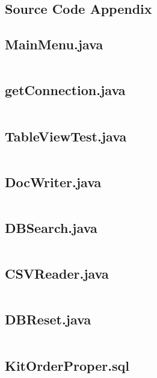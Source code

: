 \documentclass[
11pt, %
a4paper, %
oneside, %
headinclude,footinclude, %
BCOR5mm, %
]{scrartcl}
\begin{document}
\begin{appendices}
\section{Source Code Appendix}
\subsection{MainMenu.java}
\inputminted[linenos, breaklines]{java}{/Users/tsmoffat/kitordersystem/kitordersystem/kitordersystem/MainMenu.java}
\subsection{getConnection.java}
\inputminted[linenos, breaklines]{java}{/Users/tsmoffat/kitordersystem/kitordersystem/kitordersystem/getConnection.java}
\subsection{TableViewTest.java}
\inputminted[linenos, breaklines]{java}{/Users/tsmoffat/kitordersystem/kitordersystem/kitordersystem/TableViewTest.java}
\subsection{DocWriter.java}
\inputminted[linenos, breaklines]{java}{/Users/tsmoffat/kitordersystem/kitordersystem/kitordersystem/DocWriter.java}
\subsection{DBSearch.java}
\inputminted[linenos, breaklines]{java}{/Users/tsmoffat/kitordersystem/kitordersystem/kitordersystem/DBSearch.java}
\subsection{CSVReader.java}
\inputminted[linenos, breaklines]{java}{/Users/tsmoffat/kitordersystem/kitordersystem/kitordersystem/CSVReader.java}
\subsection{DBReset.java}
\inputminted[linenos, breaklines]{java}{/Users/tsmoffat/kitordersystem/kitordersystem/kitordersystem/DBReset.java}
\subsection{KitOrderProper.sql}
\inputminted[linenos, breaklines]{SQL}{/Users/tsmoffat/kitordersystem/kitordersystem/kitordersystem/KitOrderProper.sql}

\end{appendices}
\end{document}
